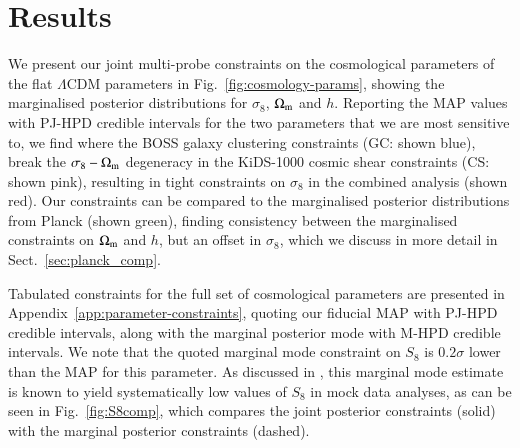 \section{Results}
\label{sec:results}
We present our joint multi-probe constraints on the cosmological parameters of the flat $\Lambda$CDM parameters  in Fig.~\ref{fig:cosmology-params}, showing the marginalised posterior distributions for $\sigma_8$, $\Omega_{\rm m}$ and $h$. 
Reporting the MAP values with PJ-HPD credible intervals for the two  parameters that we are most sensitive to, we find 
where the BOSS galaxy clustering constraints (GC: shown blue), break the $\sigma_8-\Omega_{\rm m}$ degeneracy in the KiDS-1000 cosmic shear constraints (CS: shown pink), resulting in tight constraints on $\sigma_8$ in the combined \tttp analysis (shown red). 
Our constraints can be compared to the marginalised posterior distributions from Planck (shown green), finding consistency between the marginalised constraints on $\Omega_{\rm m}$ and $h$, but an offset in $\sigma_8$,  which we discuss in more detail in Sect.~\ref{sec:planck_comp}.

Tabulated constraints for the full set of cosmological parameters are presented in Appendix~\ref{app:parameter-constraints}, quoting our fiducial MAP with PJ-HPD credible intervals, along with the marginal posterior mode with M-HPD credible intervals. 
We note that the quoted marginal mode constraint on $S_8$ is $0.2\sigma$ lower than the MAP for this parameter. 
As discussed in \citet{joachimi/etal:inprep}, this marginal mode estimate is known to yield systematically low values of $S_8$ in mock data analyses, as can be seen in Fig.~\ref{fig:S8comp}, which compares the joint posterior constraints (solid) with the marginal posterior constraints (dashed).  


